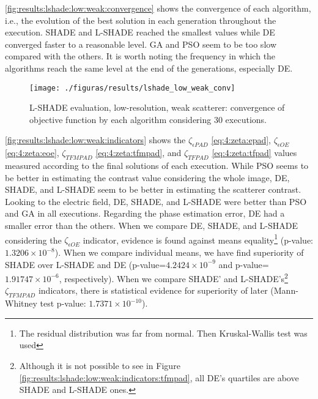 			\autoref{fig:results:lshade:low:weak:convergence} shows the convergence of each algorithm, i.e., the evolution of the best solution in each generation throughout the execution. SHADE and L-SHADE reached the smallest values while DE converged faster to a reasonable level. GA and PSO seem to be too slow compared with the others. It is worth noting the frequency in which the algorithms reach the same level at the end of the generations, especially DE. 
		
			\begin{figure}
				\centering
				\texttt{[image: ./figuras/results/lshade\_low\_weak\_conv]}
				\caption[L-SHADE evaluation, low-resolution, weak scatterer: convergence.]{L-SHADE evaluation, low-resolution, weak scatterer: convergence of objective function by each algorithm considering 30 executions.}
				\label{fig:results:lshade:low:weak:convergence}
			\end{figure}
			
			\autoref{fig:results:lshade:low:weak:indicators} shows the $\zeta_{\epsilon PAD}$ \eqref{eq:4:zeta:epad}, $\zeta_{\epsilon OE}$ \eqref{eq:4:zeta:eoe}, $\zeta_{TFMPAD}$ \eqref{eq:4:zeta:tfmpad}, and $\zeta_{TFPAD}$ \eqref{eq:4:zeta:tfpad} values measured according to the final solutions of each execution. While PSO seems to be better in estimating the contrast value considering the whole image, DE, SHADE, and L-SHADE seem to be better in estimating the scatterer contrast. Looking to the electric field, DE, SHADE, and L-SHADE were better than PSO and GA in all executions. Regarding the phase estimation error, DE had a smaller error than the others. When we compare DE, SHADE, and L-SHADE considering the $\zeta_{\epsilon OE}$ indicator, evidence is found against means equality\footnote{The residual distribution was far from normal. Then Kruskal-Wallis test was used} (p-value: $1.3206\times10^{-8}$). When we compare individual means, we have find superiority of SHADE over L-SHADE and DE (p-value=$4.2424\times10^{-9}$ and p-value=$1.91747\times10^{-6}$, respectively). When we compare SHADE' and L-SHADE's\footnote{Although it is not possible to see in Figure \ref{fig:results:lshade:low:weak:indicators:tfmpad}, all DE's quartiles are above SHADE and L-SHADE ones.} $\zeta_{TFMPAD}$ indicators, there is statistical evidence for superiority of later (Mann-Whitney test p-value: $1.7371\times10^{-10}$).

